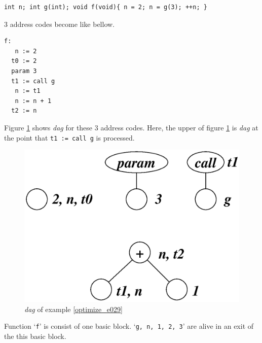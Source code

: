 \begin{Example}
\label{optimize_e029}
\begin{verbatim}
int n; int g(int); void f(void){ n = 2; n = g(3); ++n; }
\end{verbatim}
3 address codes become like bellow.
\begin{verbatim}
f:
   n := 2
  t0 := 2
  param 3
  t1 := call g
   n := t1
   n := n + 1
  t2 := n
\end{verbatim}
Figure \ref{optimize_e030} shows {\em dag} for these 3 address codes.
Here, the upper of figure \ref{optimize_e030} is {\em dag}
at the point that {\tt{t1 := call g}} is processed.
\begin{figure}[htbp]
\begin{center}
\includegraphics[width=0.8\linewidth,height=0.571\linewidth]{opt013.eps}
\caption{{\em dag} of example \ref{optimize_e029}}
\label{optimize_e030}
\end{center}
\end{figure}
Function `{\tt{f}}' is consist of one basic block.
`{\tt{g, n, 1, 2, 3}}' are alive in an exit of the this basic block.


\end{Example}
